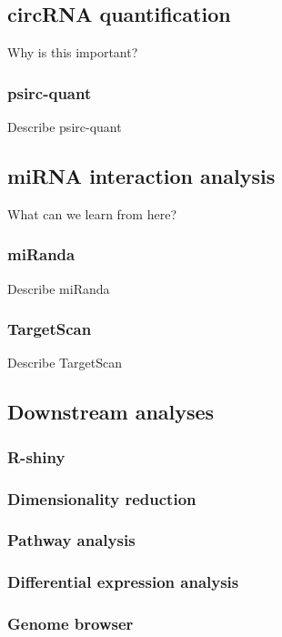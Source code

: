\subsection{circRNA quantification}

Why is this important?

\subsubsection{psirc-quant}
Describe psirc-quant

\subsection{miRNA interaction analysis}
What can we learn from here?

\subsubsection{miRanda}
Describe miRanda

\subsubsection{TargetScan}
Describe TargetScan

\subsection{Downstream analyses}
\subsubsection{R-shiny}
\subsubsection{Dimensionality reduction}
\subsubsection{Pathway analysis}
\subsubsection{Differential expression analysis}
\subsubsection{Genome browser}
